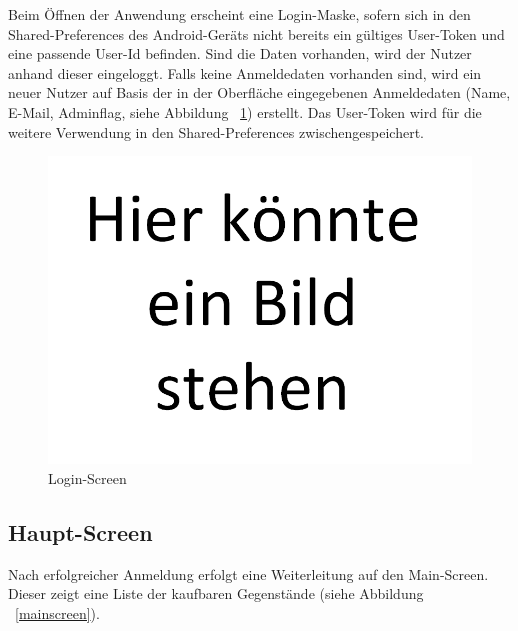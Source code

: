 \documentclass{scrartcl}
\begin{document}
	Beim Öffnen der Anwendung erscheint eine Login-Maske, sofern sich in den Shared-Preferences des Android-Geräts nicht bereits ein gültiges User-Token und eine passende User-Id befinden.
	Sind die Daten vorhanden, wird der Nutzer anhand dieser eingeloggt.
	Falls keine Anmeldedaten vorhanden sind, wird ein neuer Nutzer auf Basis der in der Oberfläche eingegebenen Anmeldedaten (Name, E-Mail, Adminflag, siehe Abbildung ~\ref{loginscreen}) erstellt.
	Das User-Token wird für die weitere Verwendung in den Shared-Preferences zwischengespeichert.

	\begin{figure}[!h]
		\centering
		\includegraphics[scale=0.5]{./figures/placeholder.png}
		\caption{Login-Screen}
		\label{loginscreen}
	\end{figure}

	\subsection{Haupt-Screen}\label{subsec:haupt-screen}

	Nach erfolgreicher Anmeldung erfolgt eine Weiterleitung auf den Main-Screen.
	Dieser zeigt eine Liste der kaufbaren Gegenstände (siehe Abbildung ~\ref{mainscreen}).
\end{document}
